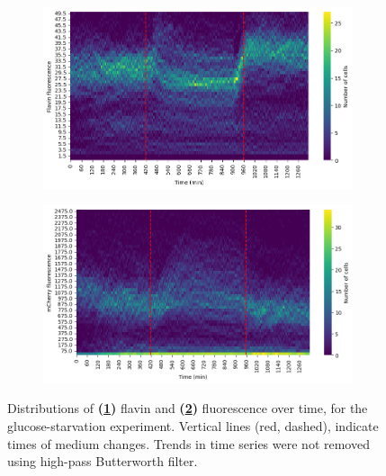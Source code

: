 \begin{figure}
  \centering
  \begin{subfigure}[htpb]{0.8\textwidth}
   \centering
   \includegraphics[width=\textwidth]{19972_distribs_flavin.png}
   \caption{
   }
   \label{fig:biology-starvation-histogram-flavin}
  \end{subfigure}

  \begin{subfigure}[htpb]{0.8\textwidth}
   \centering
   \includegraphics[width=\textwidth]{19972_distribs_mCherry.png}
   \caption{
   }
   \label{fig:biology-starvation-histogram-mCherry}
  \end{subfigure}

  \caption{
    Distributions of \textbf{(\ref{fig:biology-starvation-histogram-flavin})} flavin and \textbf{(\ref{fig:biology-starvation-histogram-mCherry})} fluorescence over time, for the glucose-starvation experiment.
    Vertical lines (red, dashed), indicate times of medium changes.
    Trends in time series were not removed using high-pass Butterworth filter.
  }
  \label{fig:biology-starvation-histogram}
\end{figure}

